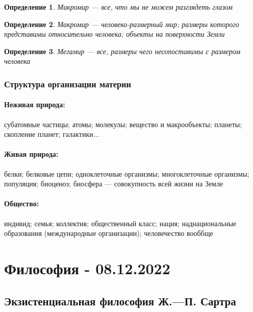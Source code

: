 \documentclass{article}
\newtheorem{definition}{Определение}
\begin{document}
\begin{flushleft}
\begin{definition}
    Микромир — все, что мы не можем разглядеть глазом
\end{definition}

\begin{definition}
    Макромир — человеко-размерный мир; размеры которого представимы относительно человека; объекты на поверхности Земли
\end{definition}

\begin{definition}
    Мегамир — все, размеры чего несопоставимы с размером человека
\end{definition}

\subsubsection{Структура организации материи}

\paragraph{Неживая природа:} субатомные частицы; атомы; молекулы; вещество и макрообъекты; планеты; скопление планет; галактики...

\paragraph{Живая природа:} белки; белковые цепи; одноклеточные организмы; многоклеточные организмы; популяция; биоценоз; биосфера — совокупность всей жизни на Земле

\paragraph{Общество:} индивид; семья; коллектив; общественный класс; нация; наднациональные образования (международные организации); человечество вооббще

\end{flushleft}

\pagebreak
\section{Философия - 08.12.2022}

\subsection{Экзистенциальная философия Ж.—П. Сартра}
\end{document}
